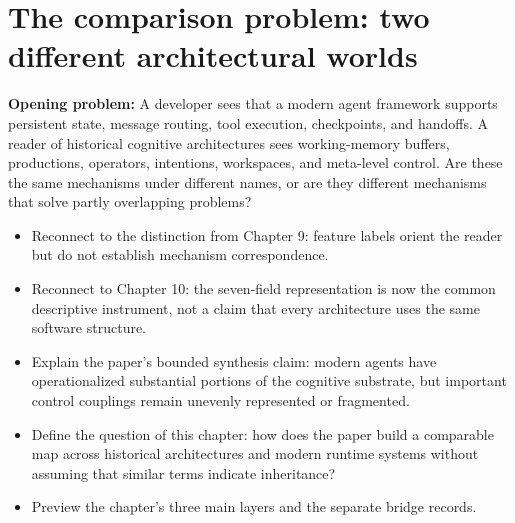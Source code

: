 \section{The comparison problem: two different architectural worlds}
\textbf{Opening problem:} A developer sees that a modern agent framework supports persistent state, message routing, tool execution, checkpoints, and handoffs. A reader of historical cognitive architectures sees working-memory buffers, productions, operators, intentions, workspaces, and meta-level control. Are these the same mechanisms under different names, or are they different mechanisms that solve partly overlapping problems?
\begin{itemize}
  \item Reconnect to the distinction from Chapter 9: feature labels orient the reader but do not establish mechanism correspondence.
  \item Reconnect to Chapter 10: the seven-field representation is now the common descriptive instrument, not a claim that every architecture uses the same software structure.
  \item Explain the paper's bounded synthesis claim: modern agents have operationalized substantial portions of the cognitive substrate, but important control couplings remain unevenly represented or fragmented.
  \item Define the question of this chapter: how does the paper build a comparable map across historical architectures and modern runtime systems without assuming that similar terms indicate inheritance?
  \item Preview the chapter's three main layers and the separate bridge records.
\end{itemize}

